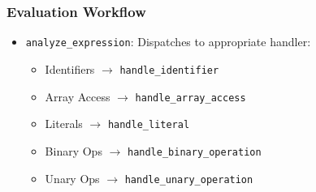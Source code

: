 \documentclass[12pt,a4paper]{article}
\begin{document}
\subsubsection*{Evaluation Workflow}
\begin{itemize}
    \item \texttt{analyze\_expression}: Dispatches to appropriate handler:
    \begin{itemize}
        \item Identifiers $\rightarrow$ \texttt{handle\_identifier}
        \item Array Access $\rightarrow$ \texttt{handle\_array\_access}
        \item Literals $\rightarrow$ \texttt{handle\_literal}
        \item Binary Ops $\rightarrow$ \texttt{handle\_binary\_operation}
        \item Unary Ops $\rightarrow$ \texttt{handle\_unary\_operation}
    \end{itemize}
\end{itemize}
\end{document}
